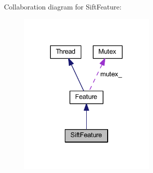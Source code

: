 Collaboration diagram for Sift\-Feature\-:\nopagebreak
\begin{figure}[H]
\begin{center}
\leavevmode
\includegraphics[width=188pt]{class_sift_feature__coll__graph}
\end{center}
\end{figure}
